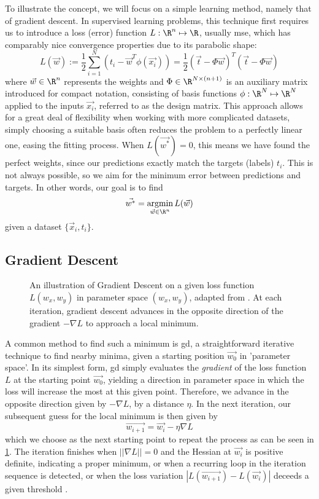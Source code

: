 To illustrate the concept, we will focus on a simple learning method, namely that of gradient descent.
In supervised learning problems, this technique first requires us to introduce a loss (error) function $L: \R^n \mapsto \R$, usually \gls{mse}, which has comparably nice convergence properties due to its parabolic shape:
$$L(\vec{w}) := \frac{1}{2} \sum_{i=1}^N (t_i - \vec{w}^T \phi(\vec{x_i})) = \frac{1}{2} (\vec{t} - \Phi \vec{w})^T (\vec{t} - \Phi \vec{w})$$
where $\vec{w} \in \R^n$ represents the weights and $\Phi \in \R^{N \times (n+1)}$ is an auxiliary matrix introduced for compact notation, consisting of basis functions $\phi: \R^N \mapsto \R^N$ applied to the inputs $\vec{x_i}$, referred to as the design matrix.
This approach allows for a great deal of flexibility when working with more complicated datasets, simply choosing a suitable basis often reduces the problem to a perfectly linear one, easing the fitting process.
When $L(\vec{w^*}) = 0$, this means we have found the perfect weights, since our predictions exactly match the targets (labels) $t_i$.
This is not always possible, so we aim for the minimum error between predictions and targets.
In other words, our goal is to find
$$\vec{w^*} = \underset{\vec{w} \in \R^n}{\text{argmin}}\, L(\vec{w})$$
given a dataset $\{\vec{x}_i, t_i\}$.

\subsection{Gradient Descent}
\begin{figure}[H]
  \centering
  \caption[Illustration of Gradient Descent]{
    An illustration of Gradient Descent on a given loss function $L(w_x, w_y)$ in parameter space $(w_x, w_y)$, adapted from \cite{gradient-descent-plot}.
    At each iteration, gradient descent advances in the opposite direction of the gradient $-\nabla L$ to approach a local minimum.
  }
  \label{fig:gradient-descent}
\end{figure}

A common method to find such a minimum is \gls{gd}, a straightforward iterative technique to find nearby minima, given a starting position $\vec{w_0}$ in 'parameter space'.
In its simplest form, \gls{gd} simply evaluates the \textit{gradient} of the loss function $L$ at the starting point $\vec{w_0}$, yielding a direction in parameter space in which the loss will increase the most at this given point.
Therefore, we advance in the opposite direction given by $-\nabla L$, by a distance $\eta$.
In the next iteration, our subsequent guess for the local minimum is then given by $$\vec{w_{i+1}} = \vec{w_i} - \eta \nabla L$$
which we choose as the next starting point to repeat the process as can be seen in \cref{fig:gradient-descent}.
The iteration finishes when $||\nabla L|| = 0$ and the Hessian at $\vec{w_i}$ is positive definite, indicating a proper minimum, or when a recurring loop in the iteration sequence is detected, or when the loss variation $|L(\vec{w_{i+1}}) - L(\vec{w_i})|$ deceeds a given threshold \parencite{bishop-pattern-recognition-and-ml}.


